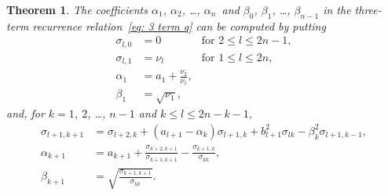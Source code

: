 \documentclass[12pt,a4paper]{article}
\newtheorem{theorem}{Theorem}
\begin{document}
\begin{theorem}
The coefficients $\alpha_1$, $\alpha_2$, \dots, $\alpha_n$~and 
$\beta_0$, $\beta_1$, \dots, $\beta_{n-1}$ in the three-term 
recurrence relation~\eqref{eq: 3 term q} can be computed by putting
\[
\begin{aligned}
\sigma_{l,0}&=0&\text{for $2\le l\le 2n-1$},\\
\sigma_{l,1}&=\nu_l&\text{for $1\le l\le2n$},\\
\alpha_1&=a_1+\frac{\nu_2}{\nu_1},\\
\beta_1&=\sqrt{\nu_1},
\end{aligned} 
\]
and, for $k=1$, $2$, \dots, $n-1$ and $k\le l\le2n-k-1$, 
\[
\begin{aligned}
\sigma_{l+1,k+1}&=\sigma_{l+2,k}+(a_{l+1}-\alpha_k)\sigma_{l+1,k}
		+b_{l+1}^2\sigma_{lk}-\beta_k^2\sigma_{l+1,k-1},\\
\alpha_{k+1}&=a_{k+1}+\frac{\sigma_{k+2,k+1}}{\sigma_{k+1,k+1}}
	-\frac{\sigma_{k+1,k}}{\sigma_{kk}},\\
\beta_{k+1}&=\sqrt{\frac{\sigma_{k+1,k+1}}{\sigma_{kk}}}.
\end{aligned}
\]
\end{theorem}
\end{document}
